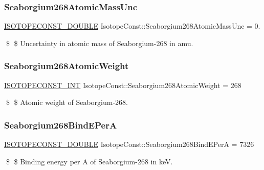 \subsubsection{\texorpdfstring{Seaborgium268\+Atomic\+Mass\+Unc}{Seaborgium268AtomicMassUnc}}
{\footnotesize\ttfamily \mbox{\hyperlink{group___isotope_const-_macros_ga8f45a7272ce02c0b4c65c44636ed719a}{I\+S\+O\+T\+O\+P\+E\+C\+O\+N\+S\+T\+\_\+\+D\+O\+U\+B\+LE}} Isotope\+Const\+::\+Seaborgium268\+Atomic\+Mass\+Unc = 0.}

\$ \$ Uncertainty in atomic mass of Seaborgium-\/268 in amu. \mbox{\label{group___isotope_const-_seaborgium-_sg268_ga5b0f95d2a2bd15127203a3b4421ba749}} 
\subsubsection{\texorpdfstring{Seaborgium268\+Atomic\+Weight}{Seaborgium268AtomicWeight}}
{\footnotesize\ttfamily \mbox{\hyperlink{group___isotope_const-_macros_ga5f18360b3e99483a35c32d789e62621c}{I\+S\+O\+T\+O\+P\+E\+C\+O\+N\+S\+T\+\_\+\+I\+NT}} Isotope\+Const\+::\+Seaborgium268\+Atomic\+Weight = 268}

\$ \$ Atomic weight of Seaborgium-\/268. \mbox{\label{group___isotope_const-_seaborgium-_sg268_ga81e835ea89d76f9eb35da0e117c2e70e}} 
\subsubsection{\texorpdfstring{Seaborgium268\+Bind\+E\+PerA}{Seaborgium268BindEPerA}}
{\footnotesize\ttfamily \mbox{\hyperlink{group___isotope_const-_macros_ga8f45a7272ce02c0b4c65c44636ed719a}{I\+S\+O\+T\+O\+P\+E\+C\+O\+N\+S\+T\+\_\+\+D\+O\+U\+B\+LE}} Isotope\+Const\+::\+Seaborgium268\+Bind\+E\+PerA = 7326}

\$ \$ Binding energy per A of Seaborgium-\/268 in keV. \mbox{\label{group___isotope_const-_seaborgium-_sg268_gac19be87b8fbd197316b3d892ddb2d75c}} 
